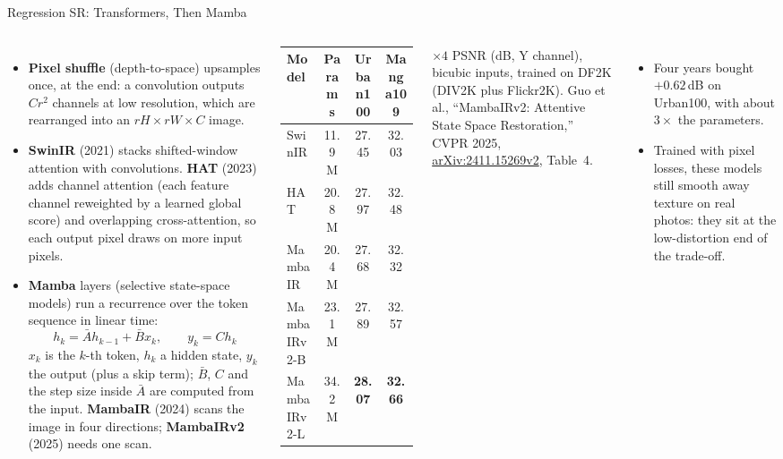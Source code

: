 \begin{frame}{Regression SR: Transformers, Then Mamba}
  \begin{columns}[T,onlytextwidth]
      \begin{itemize}\footnotesize\itemsep0.3em
        \item \textbf{Pixel shuffle} (depth-to-space) upsamples once, at the end: a convolution outputs $C r^2$ channels at low resolution, which are rearranged into an $rH \times rW \times C$ image.
        \item \textbf{SwinIR} (2021) stacks shifted-window attention with convolutions. \textbf{HAT} (2023) adds channel attention (each feature channel reweighted by a learned global score) and overlapping cross-attention, so each output pixel draws on more input pixels.
        \item \textbf{Mamba} layers (selective state-space models) run a recurrence over the token sequence in linear time:
        \[ h_k = \bar{A} h_{k-1} + \bar{B} x_k, \qquad y_k = C h_k \]
        $x_k$ is the $k$-th token, $h_k$ a hidden state, $y_k$ the output (plus a skip term); $\bar{B}$, $C$ and the step size inside $\bar{A}$ are computed from the input. \textbf{MambaIR} (2024) scans the image in four directions; \textbf{MambaIRv2} (2025) needs one scan.
      \end{itemize}
      {\centering\scriptsize\setlength{\tabcolsep}{4pt}
      \begin{tabular}{l c c c}
        \toprule
        \textbf{Model} & \textbf{Params} & \textbf{Urban100} & \textbf{Manga109} \\
        \midrule
        SwinIR & 11.9M & 27.45 & 32.03 \\
        HAT & 20.8M & 27.97 & 32.48 \\
        MambaIR & 20.4M & 27.68 & 32.32 \\
        MambaIRv2-B & 23.1M & 27.89 & 32.57 \\
        MambaIRv2-L & 34.2M & \textbf{28.07} & \textbf{32.66} \\
        \bottomrule
      \end{tabular}\par}
      \vspace{0.2em}
      {\scriptsize $\times 4$ PSNR (dB, Y channel), bicubic inputs, trained on DF2K (DIV2K plus Flickr2K). Guo et al., ``MambaIRv2: Attentive State Space Restoration,'' CVPR 2025, \href{https://arxiv.org/abs/2411.15269v2}{arXiv:2411.15269v2}, Table~4.\par}
      \vspace{0.4em}
      \begin{itemize}\footnotesize\itemsep0.3em
        \item Four years bought $+0.62$\,dB on Urban100, with about $3\times$ the parameters.
        \item Trained with pixel losses, these models still smooth away texture on real photos: they sit at the low-distortion end of the trade-off.
      \end{itemize}
  \end{columns}
\end{frame}

